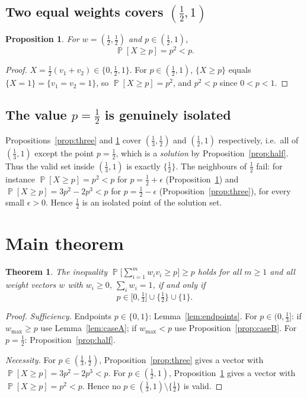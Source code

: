\documentclass[11pt]{article}
\newtheorem{theorem}{Theorem}
\newtheorem{proposition}{Proposition}
\theoremstyle{definition}
\DeclareMathOperator{\PP}{\mathbb{P}}
\begin{document}
\subsection{Two equal weights covers \texorpdfstring{$(\tfrac12,1)$}{(1/2,1)}}

\begin{proposition}\label{prop:two}
For $w=(\tfrac12,\tfrac12)$ and $p\in(\tfrac12,1)$,
\[
\PP[X\ge p]=p^2<p.
\]
\end{proposition}

\begin{proof}
$X=\tfrac12(v_1+v_2)\in\{0,\tfrac12,1\}$. For $p\in(\tfrac12,1)$, $\{X\ge p\}$
equals $\{X=1\}=\{v_1=v_2=1\}$, so $\PP[X\ge p]=p^2$, and $p^2<p$ since
$0<p<1$.
\end{proof}

\subsection{The value \texorpdfstring{$p=\tfrac12$}{p=1/2} is genuinely isolated}

Propositions~\ref{prop:three} and \ref{prop:two} cover $(\tfrac13,\tfrac12)$ and
$(\tfrac12,1)$ respectively, i.e.\ all of $(\tfrac13,1)$ except the point
$p=\tfrac12$, which is a \emph{solution} by Proposition~\ref{prop:half}. Thus the
valid set inside $(\tfrac13,1)$ is exactly $\{\tfrac12\}$. The neighbours of
$\tfrac12$ fail: for instance $\PP[X\ge p]=p^2<p$ for $p=\tfrac12+\epsilon$
(Proposition~\ref{prop:two}) and $\PP[X\ge p]=3p^2-2p^3<p$ for
$p=\tfrac12-\epsilon$ (Proposition~\ref{prop:three}), for every small
$\epsilon>0$. Hence $\tfrac12$ is an isolated point of the solution set.

\section{Main theorem}

\begin{theorem}\label{thm:main}
The inequality $\PP\big[\sum_{i=1}^m w_iv_i\ge p\big]\ge p$ holds for all $m\ge1$
and all weight vectors $w$ with $w_i\ge0$, $\sum_i w_i=1$, if and only if
\[
p\in\Big[0,\tfrac13\Big]\cup\Big\{\tfrac12\Big\}\cup\{1\}.
\]
\end{theorem}

\begin{proof}
\emph{Sufficiency.} Endpoints $p\in\{0,1\}$: Lemma~\ref{lem:endpoints}. For
$p\in(0,\tfrac13]$: if $w_{\max}\ge p$ use Lemma~\ref{lem:caseA}; if $w_{\max}<p$
use Proposition~\ref{prop:caseB}. For $p=\tfrac12$:
Proposition~\ref{prop:half}.

\emph{Necessity.} For $p\in(\tfrac13,\tfrac12)$,
Proposition~\ref{prop:three} gives a vector with $\PP[X\ge p]=3p^2-2p^3<p$. For
$p\in(\tfrac12,1)$, Proposition~\ref{prop:two} gives a vector with
$\PP[X\ge p]=p^2<p$. Hence no $p\in(\tfrac13,1)\setminus\{\tfrac12\}$ is valid.
\end{proof}
\end{document}
